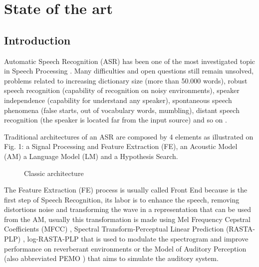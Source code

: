 \chapter{State of the art}
\section{Introduction}
Automatic Speech Recognition (ASR) has been one of the most investigated topic in Speech Processing \cite{Rabiner1993FundamentalsRecognition}. Many difficulties and open questions still remain unsolved, problems related to increasing dictionary size (more than 50.000 words), robust speech recognition (capability of recognition on noisy environments), speaker independence (capability for understand any speaker), spontaneous speech phenomena (false starts, out of vocabulary words, mumbling), distant speech recognition (the speaker is located far from the input source) and so on \cite{Trentin2001ARecognition}.


Traditional architectures of an ASR are composed by 4 elements as illustrated on Fig. 1: a Signal Processing and Feature Extraction (FE), an Acoustic Model (AM) a Language Model (LM) and a Hypothesis Search.

\begin{figure}
\centering
{}

\caption{Classic architecture \cite{YuAutomaticApproach}}
\label{fig:fig1}
\end{figure}

The Feature Extraction (FE) process is usually called Front End because is the first step of Speech Recognition, its labor is to enhance the speech, removing distortions noise and transforming the wave in a representation that can be used from the AM, usually this transformation is made using Mel Frequency Cepstral Coefficients (MFCC) \cite{Davis1980ComparisonSentences}, Spectral Transform-Perceptual Linear Prediction (RASTA-PLP) \cite{Hermansky1990PerceptualSpeech}, log-RASTA-PLP that is used to modulate the spectrogram and improve performance on reverberant environments \cite{Kingsbury1998RobustSpectrogram} or the Model of Auditory Perception\cite{Dau1996AStructure.} (also abbreviated PEMO \cite{Kleinschmidt2001CombiningRecognition}) that aims to simulate the auditory system. 

